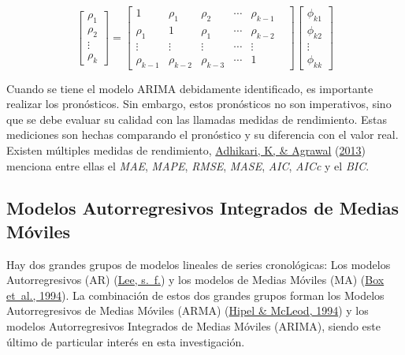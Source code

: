 \documentclass[
]{article}
\begin{document}
\begin{equation}
\label{eqn:sistema_yule_walker_matricial}
\left[ \begin{array}{c} \rho_1 \\ \rho_2 \\ \vdots \\ \rho_k \end{array} \right] = \begin{bmatrix} 1 & \rho_1 & \rho_2 & \cdots & \rho_{k-1} \\ \rho_1 & 1 & \rho_1 & \cdots & \rho_{k-2} \\ \vdots & \vdots & \vdots & \cdots & \vdots \\ \rho_{k-1} & \rho_{k-2} & \rho_{k-3} & \cdots & 1 &\end{bmatrix} \left[ \begin{array}{c} \phi_{k1} \\ \phi_{k2}  \\ \vdots \\ \phi_{kk} \end{array} \right]\end{equation}

Cuando se tiene el modelo ARIMA debidamente identificado, es importante
realizar los pronósticos. Sin embargo, estos pronósticos no son
imperativos, sino que se debe evaluar su calidad con las llamadas
medidas de rendimiento. Estas mediciones son hechas comparando el
pronóstico y su diferencia con el valor real. Existen múltiples medidas
de rendimiento, \protect\hyperlink{ref-medidas}{Adhikari, K, \& Agrawal}
(\protect\hyperlink{ref-medidas}{2013}) menciona entre ellas el
\emph{MAE}, \emph{MAPE}, \emph{RMSE}, \emph{MASE}, \emph{AIC},
\emph{AICc} y el \emph{BIC}.

\subsection{Modelos Autorregresivos Integrados de Medias Móviles}

Hay dos grandes grupos de modelos lineales de series cronológicas: Los
modelos Autorregresivos (AR) (\protect\hyperlink{ref-Lee}{Lee, s.~f.}) y
los modelos de Medias Móviles (MA)
(\protect\hyperlink{ref-box-jenkins}{Box et~al., 1994}). La combinación
de estos dos grandes grupos forman los Modelos Autorregresivos de Medias
Móviles (ARMA) (\protect\hyperlink{ref-Hipel}{Hipel \& McLeod, 1994}) y
los modelos Autorregresivos Integrados de Medias Móviles (ARIMA), siendo
este último de particular interés en esta investigación.
\end{document}
